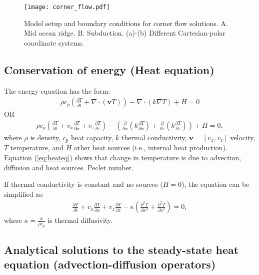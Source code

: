 \documentclass[a4paper,11pt]{article}
\begin{document}
\begin{figure}
\begin{center}
\noindent \texttt{[image: corner\_flow.pdf]} 
\caption{Model setup and boundary conditions for corner flow solutions. A. Mid ocean ridge. B. Subduction. (a)-(b) Different Cartesian-polar coordinate systems.}
\label{fig:corner_flow}
  \end{center}
\end{figure}

\subsection{Conservation of energy (Heat equation)}
The energy equation has the form:
\begin{align}
\rho c_p \left(\frac{\partial T}{\partial t} + \nabla\cdot\left(\textbf{v}T\right)\right)-\nabla\cdot (k\nabla T)+H = 0 \label{eq:heateq}
\end{align}
OR
\begin{align}
\rho c_p \left(\frac{\partial T}{\partial t} + v_x\frac{\partial T}{\partial x} + v_z\frac{\partial T}{\partial z} \right)-\left( \frac{\partial}{\partial x}\left(k\frac{\partial T}{\partial x}\right) + \frac{\partial}{\partial z}\left(k\frac{\partial T}{\partial z}\right) \right)+H = 0,
\end{align}
where $\rho$ is density, $c_p$ heat capacity, $k$ thermal conductivity, $\textbf{v} = [v_x, v_z]$ velocity, $T$ temperature, and $H$ other heat sources (i.e., internal heat production). Equation (\ref{eq:heateq}) shows that change in temperature is due to advection, diffusion and heat sources. Peclet number.

If thermal conductivity is constant and no sources ($H=0$), the equation can be simplified as:
\begin{align}
\frac{\partial T}{\partial t} + v_x\frac{\partial T}{\partial x} + v_z\frac{\partial T}{\partial z}-\kappa\left(\frac{\partial^2 T}{\partial x^2} + \frac{\partial^2 T}{\partial z^2} \right) = 0,
\end{align}
where $\kappa=\frac{k}{\rho c_p}$ is thermal diffusivity.

\subsection{Analytical solutions to the steady-state heat equation (advection-diffusion operators)}
\end{document}

